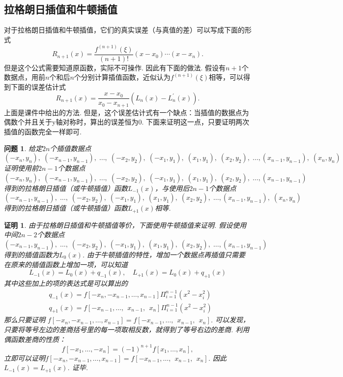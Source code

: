\documentclass{article}
\newtheorem{task}{问题}
\newtheorem*{proo}{证明}
\begin{document}
	\subsection{拉格朗日插值和牛顿插值}
	对于拉格朗日插值和牛顿插值，它们的真实误差（与真值的差）可以写成下面的形式
	\[
	R_{n+1}(x)=\frac{f^{(n+1)}(\xi)}{(n+1) !}\left(x-x_{0}\right) \cdots\left(x-x_{n}\right).
	\]
	但是这个公式需要知道原函数，实际不可操作. 因此有下面的做法. 假设有$n+1$个数据点，用前$n$个和后$n$个分别计算插值函数，近似认为$f^{(n+1)}(\xi)$相等，可以得到下面的误差估计式
	\[
	R_{n+1}(x)=\frac{x-x_{0}}{x_{0}-x_{n+1}}\left(L_{n}(x)-L_{n}^{\prime}(x)\right).
	\]
	上面是课件中给出的方法. 但是，这个误差估计式有一个缺点：当插值的数据点为偶数个并且关于y轴对称时，算出的误差恒为0. 下面来证明这一点，只要证明两次插值的函数完全一样即可.
	\begin{task}
		给定$2n$个插值数据点
		\[
		(-x_n,y_n),\;(-x_{n-1},y_{n-1}),\;\dots,\;(-x_2,y_2),\;(-x_1,y_1),\;(x_1,y_1),\;(x_2,y_2),\;\dots,(x_{n-1},y_{n-1}),\;(x_n,y_n)
		\]
		证明使用前$2n-1$个数据点
		\[
		(-x_n,y_n),\;(-x_{n-1},y_{n-1}),\;\dots,\;(-x_2,y_2),\;(-x_1,y_1),\;(x_1,y_1),\;(x_2,y_2),\;\dots,(x_{n-1},y_{n-1})
		\]
		得到的拉格朗日插值（或牛顿插值）函数$L_{-1}(x)$，与使用后$2n-1$个数据点
		\[
		(-x_{n-1},y_{n-1}),\;\dots,\;(-x_2,y_2),\;(-x_1,y_1),\;(x_1,y_1),\;(x_2,y_2),\;\dots,(x_{n-1},y_{n-1}),\;(x_n,y_n)
		\]
		得到的拉格朗日插值（或牛顿插值）函数$L_{+1}(x)$相等.
	\end{task}
	\begin{proo}
		由于拉格朗日插值和牛顿插值等价，下面使用牛顿插值来证明. 假设使用中间$2n-2$个数据点
		\[
		(-x_{n-1},y_{n-1}),\;\dots,\;(-x_2,y_2),\;(-x_1,y_1),\;(x_1,y_1),\;(x_2,y_2),\;\dots,(x_{n-1},y_{n-1})
		\]
		得到的插值函数为$L_0(x)$. 由于牛顿插值的特性，增加一个数据点再插值只需要在原来的插值函数上增加一项，可以知道
		\[
		L_{-1}(x)=L_0(x)+q_{-1}(x),\quad L_{+1}(x)=L_0(x)+q_{+1}(x)
		\]
		其中这些加上的项的表达式是可以算出的
		\[
		\begin{split}
		&q_{-1}(x)=f[-x_n,-x_{n-1},\dots,x_{n-1}]\Pi_{i=1}^{n-1}(x^2-x_i^2)\\
		&q_{+1}(x)=f[-x_{n-1},\dots,\;\,x_{n-1},\;\,x_n]\Pi_{i=1}^{n-1}(x^2-x_i^2)
		\end{split}
		\]
		那么只要证明 $f[-x_n,-x_{n-1},\dots,x_{n-1}]=f[-x_{n-1},\dots,\;\,x_{n-1},\;\,x_n]$. 可以发现，只要将等号左边的差商括号里的每一项取相反数，就得到了等号右边的差商. 利用偶函数差商的性质：
		\[
		f[-x_1,\dots,-x_n]=(-1)^{n+1}f[x_1,\dots,x_n],
		\]
		立即可以证明$f[-x_n,-x_{n-1},\dots,x_{n-1}]=f[-x_{n-1},\dots,\;\,x_{n-1},\;\,x_n]$. 因此$L_{-1}(x)=L_{+1}(x)$. 证毕.
	\end{proo}
	
\end{document}

